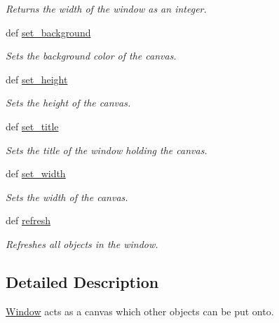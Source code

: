 \begin{DoxyCompactItemize}
\begin{DoxyCompactList}\small\item\em Returns the width of the window as an integer. \item\end{DoxyCompactList}\item 
def \hyperlink{classbroken__cs110graphics_1_1Window_ad2d9d73c97fe3eac5c1974bf4a81793a}{set\_\-background}
\begin{DoxyCompactList}\small\item\em Sets the background color of the canvas. \item\end{DoxyCompactList}\item 
def \hyperlink{classbroken__cs110graphics_1_1Window_a3eeafaf1782c5d9ab3643b06bb0fbb54}{set\_\-height}
\begin{DoxyCompactList}\small\item\em Sets the height of the canvas. \item\end{DoxyCompactList}\item 
def \hyperlink{classbroken__cs110graphics_1_1Window_af6004f9865cc8c168cc5e0959ba04050}{set\_\-title}
\begin{DoxyCompactList}\small\item\em Sets the title of the window holding the canvas. \item\end{DoxyCompactList}\item 
def \hyperlink{classbroken__cs110graphics_1_1Window_ab84dc19bc3658479e4b2386003f08570}{set\_\-width}
\begin{DoxyCompactList}\small\item\em Sets the width of the canvas. \item\end{DoxyCompactList}\item 
def \hyperlink{classbroken__cs110graphics_1_1Window_a6b54748e359110dad4a2397482ae429c}{refresh}
\begin{DoxyCompactList}\small\item\em Refreshes all objects in the window. \item\end{DoxyCompactList}\end{DoxyCompactItemize}


\subsection{Detailed Description}
\hyperlink{classbroken__cs110graphics_1_1Window}{Window} acts as a canvas which other objects can be put onto. 


